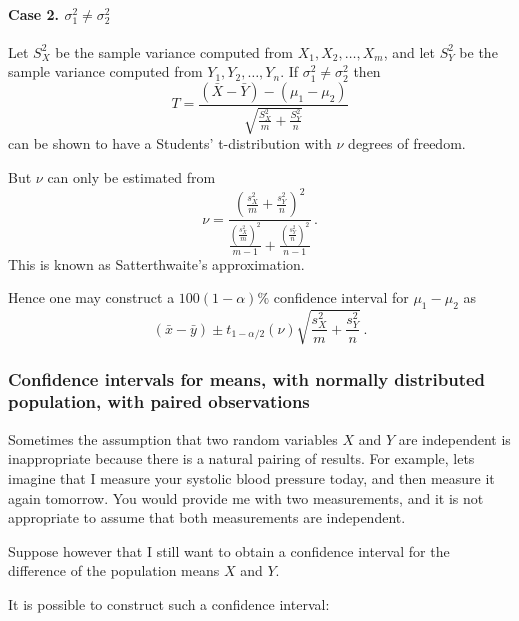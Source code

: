 \documentclass[12pt]{article}
\begin{document}
\paragraph{Case 2. $\sigma_{1}^{2} \neq \sigma_{2}^{2}$}
Let $S_{X}^{2}$ be the sample variance computed from $X_{1},X_{2},\ldots, X_{m}$, and let $S_{Y}^{2}$ be the sample variance computed from $Y_{1},Y_{2},\ldots,Y_{n}$.
If $\sigma_{1}^{2} \neq \sigma_{2}^{2}$ then
$$
T=\frac{(\bar{X}-\bar{Y})-(\mu_{1}-\mu_{2})}{\sqrt{\frac{S_{X}^{2}}{m}+\frac{S_{Y}^{2}}{n}}}
$$
can be shown to have a Students' t-distribution with $\nu$ degrees of freedom.

But $\nu$ can only be estimated from
$$
\nu=\frac{\left(\frac{s_{X}^{2}}{m}+\frac{s_{Y}^{2}}{n}\right)^2}{\frac{\left(\frac{s_{X}^{2}}{m}\right)^2}{m-1}+\frac{\left(\frac{s_{Y}^{2}}{n}\right)^2}{n-1}} \,.
$$
This is known as Satterthwaite's approximation.

Hence one may construct a $100(1-\alpha)\%$ confidence interval for $\mu_{1}-\mu_{2}$ as
$$
(\bar{x}-\bar{y}) \pm t_{1-\alpha/2}(\nu)\sqrt{\frac{s_{X}^{2}}{m}+\frac{s_{Y}^{2}}{n}}\, .
$$

\subsubsection{Confidence intervals for means, with normally distributed population, with paired observations}
Sometimes the assumption that two random variables $X$ and $Y$ are independent is inappropriate because there is a natural pairing of results. For example, lets imagine that I measure your systolic blood pressure today, and then measure it again tomorrow. You would provide me with two measurements, and it is not appropriate to assume that both measurements are independent.

Suppose however that I still want to obtain a confidence interval for the difference of the population means $X$ and $Y$.
\begin{mdframed}
{It is possible to construct such a confidence interval:}
\textcolor[rgb]{1.00,1.00,1.00}{\lipsum[1-4]}
\end{mdframed}
\end{document}
